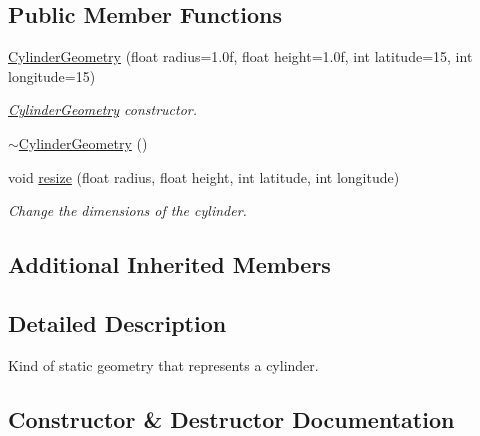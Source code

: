 \subsection*{Public Member Functions}
\begin{DoxyCompactItemize}
\item 
\mbox{\hyperlink{classec_1_1_cylinder_geometry_aa2618ccddd34ee5eb20acc43a41626bf}{Cylinder\+Geometry}} (float radius=1.\+0f, float height=1.\+0f, int latitude=15, int longitude=15)
\begin{DoxyCompactList}\small\item\em \mbox{\hyperlink{classec_1_1_cylinder_geometry}{Cylinder\+Geometry}} constructor. \end{DoxyCompactList}\item 
\mbox{\hyperlink{classec_1_1_cylinder_geometry_a8f162e4c81e60abb62cc0bf42cab7ed6}{$\sim$\+Cylinder\+Geometry}} ()
\item 
void \mbox{\hyperlink{classec_1_1_cylinder_geometry_a1646edbe6e5f0253f3312be114c1c571}{resize}} (float radius, float height, int latitude, int longitude)
\begin{DoxyCompactList}\small\item\em Change the dimensions of the cylinder. \end{DoxyCompactList}\end{DoxyCompactItemize}
\subsection*{Additional Inherited Members}


\subsection{Detailed Description}
Kind of static geometry that represents a cylinder. 

\subsection{Constructor \& Destructor Documentation}
\mbox{\label{classec_1_1_cylinder_geometry_aa2618ccddd34ee5eb20acc43a41626bf}} 
